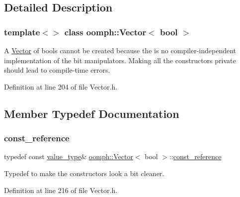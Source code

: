 \subsection{Detailed Description}
\subsubsection*{template$<$$>$\newline
class oomph\+::\+Vector$<$ bool $>$}

A \hyperlink{classoomph_1_1Vector}{Vector} of bools cannot be created because the is no compiler-\/independent implementation of the bit manipulators. Making all the constructors private should lead to compile-\/time errors. 

Definition at line 204 of file Vector.\+h.



\subsection{Member Typedef Documentation}
\mbox{\label{classoomph_1_1Vector_3_01bool_01_4_abe598d2cdaa4b6fcb78d80c67ac5e761}} 
\subsubsection{\texorpdfstring{const\+\_\+reference}{const\_reference}}
{\footnotesize\ttfamily typedef const \hyperlink{classoomph_1_1Vector_3_01bool_01_4_ae0dcf1d783a209e5a9096b2292d8fab6}{value\+\_\+type}\& \hyperlink{classoomph_1_1Vector}{oomph\+::\+Vector}$<$ bool $>$\+::\hyperlink{classoomph_1_1Vector_3_01bool_01_4_abe598d2cdaa4b6fcb78d80c67ac5e761}{const\+\_\+reference}}



Typedef to make the constructors look a bit cleaner. 



Definition at line 216 of file Vector.\+h.

\mbox{\label{classoomph_1_1Vector_3_01bool_01_4_aeb7603d575291ef47dcbade68b854f9a}} 
